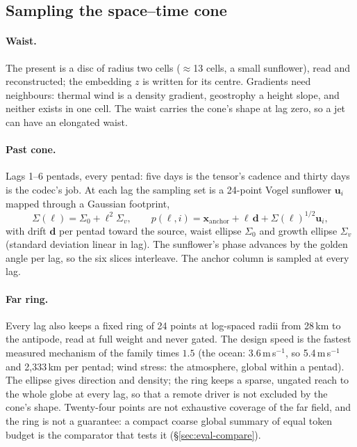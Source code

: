 \documentclass[10pt]{article}
\begin{document}
\subsection{Sampling the space--time cone}\label{sec:geometry}

\paragraph{Waist.} The present is a disc of radius two cells (${\approx}$13
cells, a small sunflower), read and reconstructed; the embedding $z$ is
written for its centre. Gradients need neighbours: thermal wind is a density
gradient, geostrophy a height slope, and neither exists in one cell. The
waist carries the cone's shape at lag zero, so a jet can have an elongated
waist.

\paragraph{Past cone.} Lags 1--6 pentads, every pentad: five days is the
tensor's cadence and thirty days is the codec's job. At each lag the sampling
set is a 24-point Vogel sunflower $\mathbf{u}_i$ mapped through a Gaussian
footprint,
\begin{equation}
\Sigma(\ell)=\Sigma_0+\ell^2\Sigma_v,\qquad
p(\ell,i)=\mathbf{x}_{\text{anchor}}+\ell\,\mathbf{d}+\Sigma(\ell)^{1/2}\mathbf{u}_i ,
\end{equation}
with drift $\mathbf{d}$ per pentad toward the source, waist ellipse
$\Sigma_0$ and growth ellipse $\Sigma_v$ (standard deviation linear in lag).
The sunflower's phase advances by the golden angle per lag, so the six slices
interleave. The anchor column is sampled at every lag.

\paragraph{Far ring.} Every lag also keeps a fixed ring of 24 points at
log-spaced radii from 28\,km to the antipode, read at full weight and never
gated. The design speed is the fastest measured mechanism of the family
times $1.5$ (the ocean: 3.6\,m\,s$^{-1}$, so 5.4\,m\,s$^{-1}$ and 2{,}333\,km
per pentad; wind stress: the atmosphere, global within a pentad). The
ellipse gives direction and density; the ring keeps a sparse, ungated reach
to the whole globe at every lag, so that a remote driver is not excluded by
the cone's shape. Twenty-four points are not exhaustive coverage of the far
field, and the ring is not a guarantee: a compact coarse global summary of
equal token budget is the comparator that tests it
(\S\ref{sec:eval-compare}).
\end{document}
